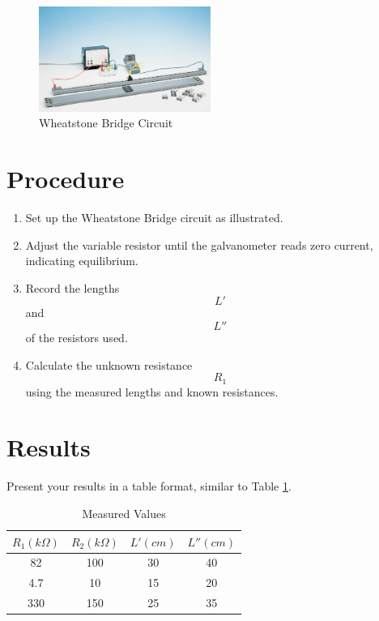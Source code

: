 \documentclass[journal]{IEEEtran}
\begin{document}
\begin{figure}[H]
    \centering
    \includegraphics[width=0.5\textwidth]{IMAGES/wheatstone_bridge.png} %
    \caption{Wheatstone Bridge Circuit \cite{lab_report}}
    \label{fig:wheatstone_bridge}
\end{figure}

\section{Procedure}
\begin{enumerate}
    \item Set up the Wheatstone Bridge circuit as illustrated.
    \item Adjust the variable resistor until the galvanometer reads zero current, indicating equilibrium.
    \item Record the lengths $$ L' $$ and $$ L'' $$ of the resistors used.
    \item Calculate the unknown resistance $$ R_1 $$ using the measured lengths and known resistances.
\end{enumerate}

\section{Results}
Present your results in a table format, similar to Table \ref{tab:results}.

\begin{table}[H]
    \centering
    \begin{tabular}{|c|c|c|c|}
        \hline
        $ R_1  (k\Omega)$ & $ R_2  (k\Omega)$ & $ L'  (cm)$ & $ L''  (cm)$ \\
        \hline
        82 & 100 & 30 & 40 \\
        4.7 & 10 & 15 & 20 \\
        330 & 150 & 25 & 35 \\
        \hline
    \end{tabular}
    \caption{Measured Values}
    \label{tab:results}
\end{table}
\end{document}
